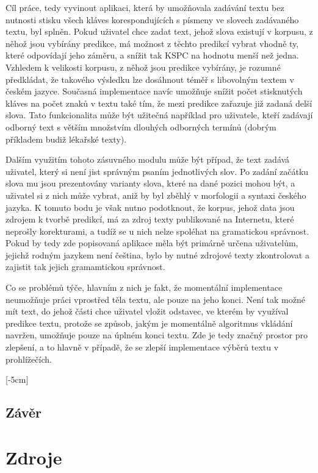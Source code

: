 \documentclass{article}
\begin{document}
Cíl práce, tedy vyvinout aplikaci, která by umožňovala zadávání textu bez nutnosti stisku všech kláves korespondujících s písmeny ve slovech zadávaného textu, byl splněn. Pokud uživatel chce zadat text, jehož slova existují v korpusu, z něhož jsou vybírány predikce, má možnost z těchto predikcí vybrat vhodně ty, které odpovídají jeho záměru, a snížit tak KSPC na hodnotu menší než jedna. Vzhledem k velikosti korpusu, z něhož jsou predikce vybírány, je rozumné předkládat, že takového výsledku lze dosáhnout téměř s libovolným textem v českém jazyce. Současná implementace navíc umožňuje snížit počet stisknutých kláves na počet znaků v textu také tím, že mezi predikce zařazuje již zadaná delší slova. Tato funkcionalita může být užitečná například pro uživatele, kteří zadávají odborný text s větším množstvím dlouhých odborných termínů (dobrým příkladem budiž lékařské texty).

Dalším využitím tohoto zásuvného modulu může být případ, že text zadává uživatel, který si není jist správným psaním jednotlivých slov. Po zadání začátku slova mu jsou prezentovány varianty slova, které na dané pozici mohou být, a uživatel si z nich může vybrat, aniž by byl zběhlý v morfologii a syntaxi českého jazyka. K tomuto bodu je však nutno podotknout, že korpus, jehož data jsou zdrojem k tvorbě predikcí, má za zdroj texty publikované na Internetu, které neprošly korekturami, a tudíž se u nich nelze spoléhat na gramatickou správnost. Pokud by tedy zde popisovaná aplikace měla být primárně určena uživatelům, jejichž rodným jazykem není čeština, bylo by nutné zdrojové texty zkontrolovat a zajistit tak jejich gramamtickou správnost.

Co se problémů týče, hlavním z nich je fakt, že momentální implementace neumožňuje práci vprostřed těla textu, ale pouze na jeho konci. Není tak možné mít text, do jehož části chce uživatel vložit odstavec, ve kterém by využíval predikce textu, protože se způsob, jakým je momentálně algoritmus vkládání navržen, umožňuje pouze na úplném konci textu. Zde je tedy značný prostor pro zlepšení, a to hlavně v případě, že se zlepší implementace výběrů textu v prohlížečích.

[-5cm]

\subsection{Závěr}



\section{Zdroje}



\end{document}
